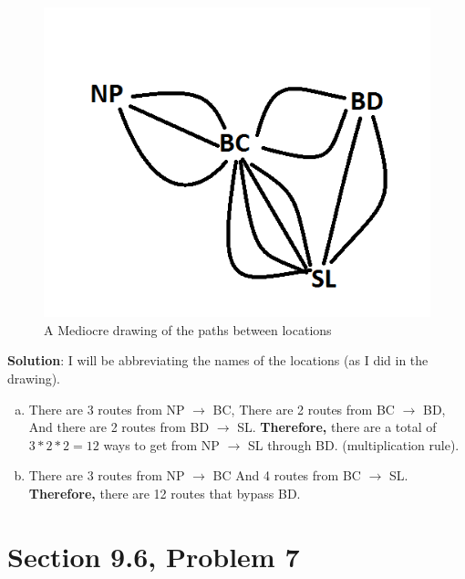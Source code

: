 \documentclass{article}
\begin{document}
\begin{large}
\begin{figure}[h]
\includegraphics[scale = 0.7]{HW2Prob4-a}
\caption{A Mediocre drawing of the paths between locations}
\centering
\end{figure}

\textbf{Solution}: I will be abbreviating the names of the locations (as I did in the drawing).
\begin{enumerate}[(a)]
    \item There are 3 routes from NP $\rightarrow$ BC, 
        \newline There are 2 routes from BC $\rightarrow$ BD,
        \newline And there are 2 routes from BD $\rightarrow$ SL.
        \newline \textbf{Therefore,} there are a total of $3*2*2 = 12$ ways to get from NP $\rightarrow$ SL through BD. (multiplication rule).
        
    \item There are 3 routes from NP $\rightarrow$ BC 
        \newline And 4 routes from BC $\rightarrow$ SL.
        \newline \textbf{Therefore,} there are 12 routes that bypass BD.
\end{enumerate}

\clearpage
\header

\section*{Section 9.6, Problem 7}


\end{large}
\end{document}
